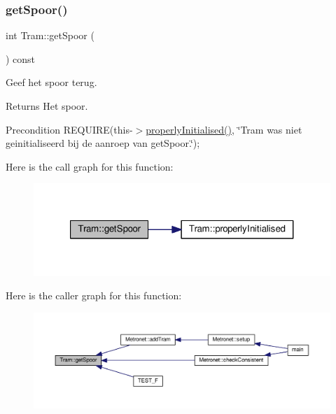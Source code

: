 \subsubsection{\texorpdfstring{get\+Spoor()}{getSpoor()}}
{\footnotesize\ttfamily int Tram\+::get\+Spoor (\begin{DoxyParamCaption}{ }\end{DoxyParamCaption}) const}



Geef het spoor terug. 

\begin{DoxyReturn}{Returns}
Het spoor. 
\end{DoxyReturn}
\begin{DoxyPrecond}{Precondition}
R\+E\+Q\+U\+I\+RE(this-\/$>$\hyperlink{class_tram_ac2688f590e4db232b4f535c9bf959efb}{properly\+Initialised()}, \char`\"{}\+Tram was niet geinitialiseerd bij de aanroep van get\+Spoor.\char`\"{}); 
\end{DoxyPrecond}
Here is the call graph for this function\+:\nopagebreak
\begin{figure}[H]
\begin{center}
\leavevmode
\includegraphics[width=321pt]{class_tram_a46c37aab218c334dac8b5340647f53ab_cgraph}
\end{center}
\end{figure}
Here is the caller graph for this function\+:\nopagebreak
\begin{figure}[H]
\begin{center}
\leavevmode
\includegraphics[width=350pt]{class_tram_a46c37aab218c334dac8b5340647f53ab_icgraph}
\end{center}
\end{figure}
\mbox{\label{class_tram_abcb1ce0d10e394fce8a99b460e5104de}} 

